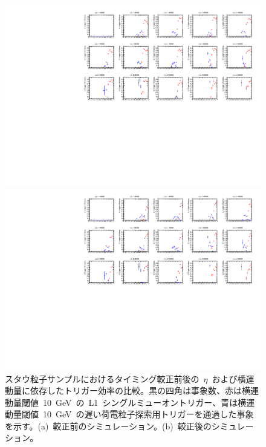 \begin{figure}[H]
    \begin{minipage}{0.49\hsize}
    \centering   
    \includegraphics[width=\textwidth,page=14]{img/rec/stau_600_ori.pdf}
    \subcaption{}
    \end{minipage}
    \begin{minipage}{0.49\hsize}
    \centering   
    \includegraphics[width=\textwidth,page=14]{img/rec/stau_600.pdf}
    \subcaption{}
    \end{minipage}
    \caption[スタウ粒子サンプルにおけるタイミング較正前後の~$\eta$~および横運動量に依存したトリガー効率の比較]{スタウ粒子サンプルにおけるタイミング較正前後の~$\eta$~および横運動量に依存したトリガー効率の比較。黒の四角は事象数、赤は横運動量閾値~10~GeV~の~L1~シングルミューオントリガー、青は横運動量閾値~10~GeV~の遅い荷電粒子探索用トリガーを通過した事象を示す。(a)~較正前のシミュレーション。(b)~較正後のシミュレーション。}\label{fig:tripteta}
\end{figure}
